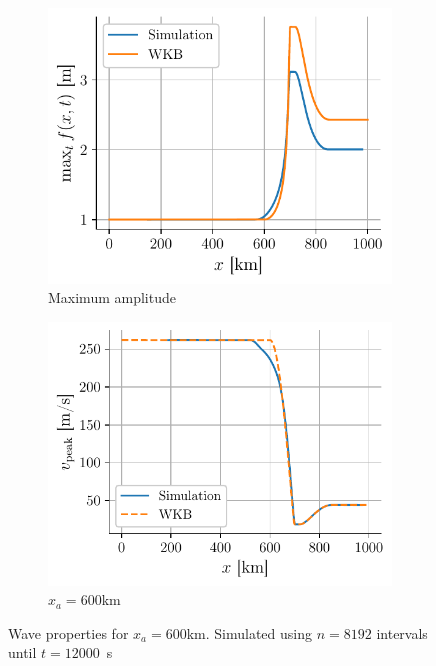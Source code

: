 \begin{figure}[h]
    \centering
    \begin{subfigure}{0.48\linewidth}
        \centering
        \includegraphics[width=\linewidth]{figures/corail_eq1_amplitude_xa=600000.0.pdf}
        \caption{Maximum amplitude}
        \label{fig:corail_eq1_amplitude_xa=60km}
    \end{subfigure}
    \begin{subfigure}{0.48\linewidth}
        \centering
        \includegraphics[width=\linewidth]{figures/corail_eq1_vitesse_xa=600000.0.pdf}
        \caption{\(x_a = 600\)km}
        \label{fig:corail_eq1_speed_xa=60km}
    \end{subfigure}
    \caption{Wave properties for \(x_a = 600\)km. Simulated using \(n=8192\) intervals until \hbox{\(t=12000\) \si{\second}}}
\end{figure}

